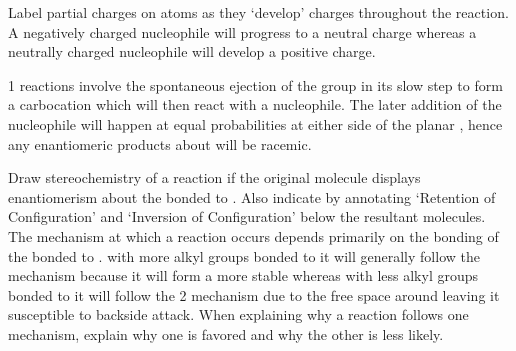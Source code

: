 \documentclass[../main]{subfiles}
\begin{document}
	Label partial charges on atoms as they `develop' charges throughout the reaction. A negatively charged nucleophile will progress to a neutral charge whereas a neutrally charged nucleophile will develop a positive charge.


	1 reactions involve the spontaneous ejection of the  group in its slow step to form a carbocation which will then react with a nucleophile. The later addition of the nucleophile will happen at equal probabilities at either side of the planar , hence any enantiomeric products about  will be racemic. \\


	

	Draw stereochemistry of a reaction if the original molecule displays enantiomerism about the  bonded to . Also indicate by annotating `Retention of Configuration' and `Inversion of Configuration' below the resultant molecules. \\

	The mechanism at which a  reaction occurs depends primarily on the bonding of the  bonded to .  with more alkyl groups bonded to it will generally follow the  mechanism because it will form a more stable  whereas  with less alkyl groups bonded to it will follow the 2 mechanism due to the free space around  leaving it susceptible to backside attack. When explaining why a reaction follows one mechanism, explain why one is favored and why the other is less likely. \\
\end{document}

